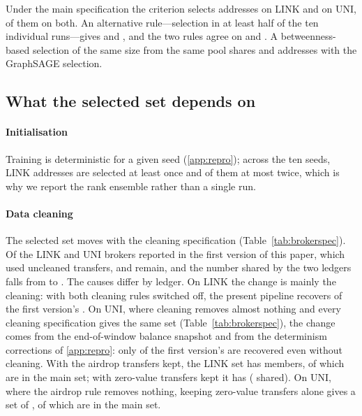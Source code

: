 Under the main specification the criterion selects  addresses
on LINK and  on UNI,  of them on both. An
alternative rule---selection in at least half of the ten individual runs---gives
 and , and the two rules agree on
 and . A betweenness-based selection
of the same size from the same pool shares  and
 addresses with the GraphSAGE selection.

\subsection{What the selected set depends on}
\label{sec:stability}
\paragraph{Initialisation}
Training is deterministic for a given seed (\ref{app:repro}); across the ten
seeds,  LINK addresses are selected at least once and
 of them at most twice, which is why we report the rank
ensemble rather than a single run.

\paragraph{Data cleaning}
The selected set moves with the cleaning specification
(Table~\ref{tab:brokerspec}). Of the  LINK and
 UNI brokers reported in the first version of this paper,
which used uncleaned transfers,  and
 remain, and the number shared by the two ledgers
falls from  to . The causes differ by
ledger. On LINK the change is mainly the cleaning: with both cleaning rules
switched off, the present pipeline recovers  of the
first version's . On UNI, where cleaning removes almost
nothing and every cleaning specification gives the same set
(Table~\ref{tab:brokerspec}), the change comes from the end-of-window balance
snapshot and from the determinism corrections of \ref{app:repro}: only
 of the first version's  are
recovered even without cleaning. With the airdrop transfers kept, the LINK set
has  members, of which
 are in the main set; with zero-value
transfers kept it has 
( shared). On UNI, where the airdrop rule
removes nothing, keeping zero-value transfers alone gives a set of
, of which  are in the main set.

